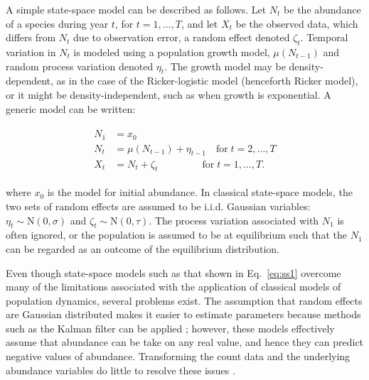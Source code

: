 \documentclass[12pt,english]{article}
\begin{document}
\begin{spacing}{1.9}
\begin{flushleft}
A simple state-space model can be described as follows.
Let $N_t$ be the abundance of a species during year $t$, for
$t=1,\hdots,T$, and let $X_t$ be
the observed data, which differs from $N_t$ due to observation error,
a random effect denoted $\zeta_t$. Temporal variation in $N_t$ is
modeled using a population growth model, $\mu(N_{t-1})$
and random process variation denoted $\eta_t$.
The growth model may be density-dependent, as in the case of the 
Ricker-logistic model (henceforth Ricker model), or it might be 
density-independent, such as when growth
is exponential. %
A generic model can be written: 
\begin{linenomath*}
\begin{gather}
  \label{eq:ss1}
  \begin{align}
    N_1 &= x_0 \nonumber \\ %
N_t &= \mu(N_{t-1}) + \eta_{t-1} \quad \text{for} \; 
t=2,\hdots,T  \\
X_t &= N_t + \zeta_t \qquad \qquad \;\, \text{for} \;
t=1,\hdots,T. \nonumber 
  \end{align}
\end{gather}
\end{linenomath*}
where $x_0$ is the model for initial abundance.  In classical
state-space models, the two sets of random effects
are assumed to be i.i.d. Gaussian variables: 
$\eta_t \sim \mathrm{N}(0, \sigma)$ and
$\zeta_t \sim \mathrm{N}(0, \tau)$. 
The process variation associated with $N_1$ is often ignored, or
the population is assumed to be at equilibrium such that the $N_1$ can
be regarded as an outcome of the equilibrium distribution.

Even though state-space models such as that shown in Eq.~\ref{eq:ss1}
overcome many of the limitations associated with the application of
classical models of population dynamics, 
several problems exist. 
The assumption that random effects are Gaussian distributed makes it
easier to estimate parameters because methods such as the Kalman
filter can be applied 
\citep{dennis_etal:2006}; however, 
these models effectively assume that abundance can be take on any
real value, and hence they can predict negative values of abundance. 
Transforming the count data and the underlying abundance variables 
do little to resolve these issues \citep{ohara_kotze:2010}.


\end{flushleft}
\end{spacing}
\end{document}
